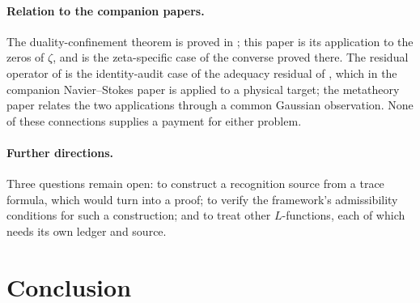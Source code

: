 \documentclass[11pt]{article}
\theoremstyle{definition}
\begin{document}
\paragraph{Relation to the companion papers.}
The duality-confinement theorem is proved in \citet{TsiokosSDTC2026};
this paper is its application to the zeros of \(\zeta\), and
 is the zeta-specific case of the
converse proved there.  The residual operator of  is the
identity-audit case of the adequacy residual of
\citet{TsiokosXiCompanion2026}, which in the companion Navier--Stokes
paper \citep{TsiokosNavier2026} is applied to a physical target; the
metatheory paper \citep{TsiokosMetaTheory2026} relates the two
applications through a common Gaussian observation.  None of these
connections supplies a payment for either problem.

\paragraph{Further directions.}
Three questions remain open: to construct a recognition source from a
trace formula, which would turn  into a
proof; to verify the framework's admissibility conditions for such a
construction; and to treat other \(L\)-functions, each of which needs
its own ledger and source.
 \section{Conclusion}
\label{sec:conclusion}
\end{document}
